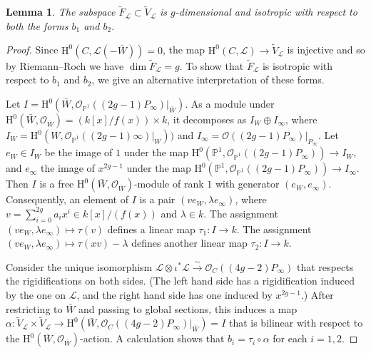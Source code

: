 \documentclass{article} %
\newtheorem{lemma}[proposition]{Lemma}
\numberwithin{equation}{section}
\newcommand{\sh}[1]{\mathscr{#1}}
\renewcommand{\P}{\mathbb{P}}
\renewcommand{\O}{\mathcal{O}}
\newcommand{\HH}{\mathrm{H}}
\begin{document}
\begin{lemma}
    The subspace $\tilde{F}_{\sh{L}}\subset \tilde{V}_{\sh{L}}$ is $g$-dimensional and isotropic with respect to both the forms $b_1$ and $b_2$.
\end{lemma}
\begin{proof}
    Since $\HH^0(C, \sh{L}(-\bar{W}))=0$, the map $\HH^0(C, \sh{L}) \rightarrow \tilde{V}_{\sh{L}}$ is injective and so by Riemann--Roch we have $\dim \tilde{F}_{\sh{L}} = g$.
    To show that $\tilde{F}_{\sh{L}}$ is isotropic with respect to $b_1$ and $b_2$, we give an alternative interpretation of these forms.

    Let $I = \HH^0(\bar{W}, \O_{\P^1}((2g-1){P_\infty})|_{\bar{W}})$.
    As a module under $\HH^0(\bar{W}, \O_{\bar{W}})  = (k[x]/f(x)) \times k$, it decomposes as $I_W \oplus I_{\infty}$, where $I_W = \HH^0(W, \O_{\P^1}((2g-1)\infty)|_W))$ and $I_{\infty} = \O((2g-1){P_\infty})|_{P_\infty}$.
    Let $e_W\in I_W$ be the image of $1$ under the map $\HH^0(\P^1,\O_{\P^1}((2g-1){P_\infty}))\rightarrow I_W$, and $e_{\infty}$ the image of $x^{2g-1}$ under the map $\HH^0(\P^1,\O_{\P^1}((2g-1){P_\infty}))\rightarrow I_{\infty}$.
    Then $I$ is a free $\HH^0(\bar{W}, \O_{\bar{W}})$-module of rank $1$ with generator $(e_W, e_{\infty})$.
    Consequently, an element of $I$ is a pair $(ve_W, \lambda e_{\infty})$, where $v = \sum_{i=0}^{2g} a_i x^{i}\in k[x]/(f(x))$ and $\lambda\in k$.
    The assignment $(ve_W, \lambda e_{\infty}) \mapsto \tau(v)$ defines a linear map $\tau_1\colon I\rightarrow k$.
    The assignment $(ve_W, \lambda e_{\infty}) \mapsto \tau(xv) - \lambda$ defines another linear map $\tau_2\colon I\rightarrow k$.
    
    
    Consider the unique isomorphism $\sh{L} \otimes \iota^*\sh{L} \xrightarrow{\sim} \O_C((4g-2)P_{\infty})$ that respects the rigidifications on both sides. (The left hand side has a rigidification induced by the one on $\sh{L}$, and the right hand side has one induced by $x^{2g-1}$.)
    After restricting to $\bar{W}$ and passing to global sections, this induces a map  $\alpha\colon \tilde{V}_{\sh{L}} \times \tilde{V}_{\sh{L}} \rightarrow \HH^0(\bar{W}, \O_{C}((4g-2)P_{\infty})|_{\bar{W}}) = I$ that is bilinear with respect to the $\HH^0(\bar{W}, \O_{\bar{W}})$-action.
    A calculation shows that $b_i = \tau_i \circ \alpha$ for each $i=1,2$.


\end{proof}
\end{document}
